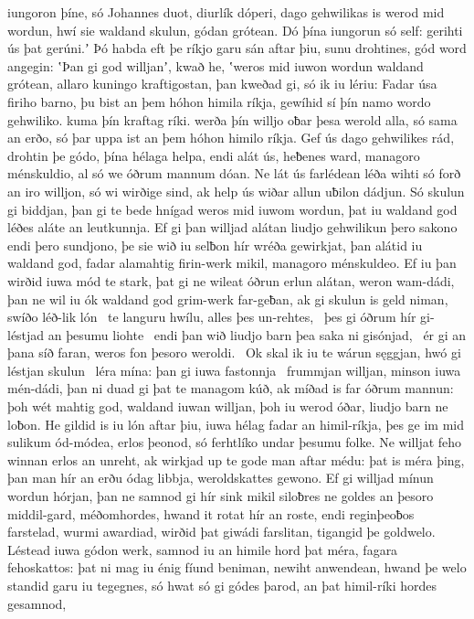iungoron þíne, só Johannes duot,
diurlík dóperi, dago gehwilikas
is werod mid wordun, hwí sie waldand skulun,
gódan grótean. Dó þína iungorun só self:
gerihti ús þat gerúni.ʼ Þó habda eft þe ríkjo garu
sán aftar þiu, sunu drohtines,
gód word angegin: ʽÞan gi god willjanʼ, kwað he,
ʽweros mid iuwon wordun waldand grótean,
allaro kuningo kraftigostan, þan kweðad gi, só ik iu lériu:
Fadar úsa firiho barno,
þu bist an þem hóhon himila ríkja,
gewíhid sí þín namo wordo gehwiliko.
kuma þín kraftag ríki.
werða þín willjo oƀar þesa werold alla,
só sama an erðo, só þar uppa ist
an þem hóhon himilo ríkja.
Gef ús dago gehwilikes rád, drohtin þe gódo,
þína hélaga helpa, endi alát ús, heƀenes ward,
managoro ménskuldio, al só we óðrum mannum dóan.
Ne lát ús farlédean léða wihti
só forð an iro willjon, só wi wirðige sind,
ak help ús wiðar allun uƀilon dádjun.
Só skulun gi biddjan, þan gi te bede hnígad
weros mid iuwom wordun, þat iu waldand god
léðes aláte an leutkunnja.
Ef gi þan willjad alátan liudjo gehwilikun
þero sakono endi þero sundjono, þe sie wið iu selƀon hír
wréða gewirkjat, þan alátid iu waldand god,
fadar alamahtig firin-werk mikil,
managoro ménskuldeo. Ef iu þan wirðid iuwa mód te stark,
þat gi ne wileat óðrun erlun alátan,
weron wam-dádi, þan ne wil iu ók waldand god
grim-werk far-geƀan, ak gi skulun is geld niman,
swíðo léð-lik lón \hld\ te languru hwílu,
alles þes un-rehtes, \hld\ þes gi óðrum hír
gi-léstjad an þesumu liohte \hld\ endi þan wið liudjo barn
þea saka ni gisónjad, \hld\ ér gi an þana síð faran,
weros fon þesoro weroldi. \hld\ Ok skal ik iu te wárun sęggjan,
hwó gi léstjan skulun \hld\ léra mína:
þan gi iuwa fastonnja \hld\ frummjan willjan,
minson iuwa mén-dádi, þan ni duad gi þat te managom kúð,
ak míðad is far óðrum mannun: þoh wét mahtig god,
waldand iuwan willjan, þoh iu werod óðar,
liudjo barn ne loƀon. He gildid is iu lón aftar þiu,
iuwa hélag fadar an himil-ríkja,
þes ge im mid sulikum ód-módea, erlos þeonod,
só ferhtlíko undar þesumu folke. Ne willjat feho winnan
erlos an unreht, ak wirkjad up te gode
man aftar médu: þat is méra þing,
þan man hír an erðu ódag libbja,
weroldskattes gewono. Ef gi willjad mínun wordun hórjan,
þan ne samnod gi hír sink mikil siloƀres ne goldes
an þesoro middil-gard, méðomhordes,
hwand it rotat hír an roste, endi reginþeoƀos farstelad,
wurmi awardiad, wirðid þat giwádi farslitan,
tigangid þe goldwelo. Léstead iuwa gódon werk,
samnod iu an himile hord þat méra,
fagara fehoskattos: þat ni mag iu énig fíund beniman,
newiht anwendean, hwand þe welo standid
garu iu tegegnes, só hwat só gi gódes þarod,
an þat himil-ríki hordes gesamnod,
